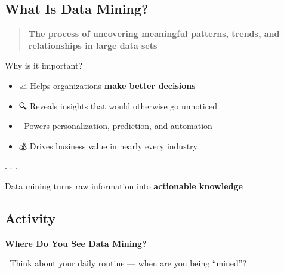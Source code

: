 \documentclass[
  letterpaper,
  DIV=11,
  numbers=noendperiod]{scrartcl}
\providecommand{\tightlist}{%
  \setlength{\itemsep}{0pt}\setlength{\parskip}{0pt}}
\begin{document}
\subsection{What Is Data Mining?}\label{what-is-data-mining-1}

\begin{quote}
\textbf{The process of uncovering meaningful patterns, trends, and
relationships in large data sets}
\end{quote}

Why is it important?

\begin{itemize}
\tightlist
\item
  📈 Helps organizations \textbf{make better decisions}
\item
  🔍 Reveals insights that would otherwise go unnoticed
\item
  🤖 Powers personalization, prediction, and automation
\item
  💰 Drives business value in nearly every industry
\end{itemize}

. . .

\begin{tcolorbox}[enhanced jigsaw, colbacktitle=quarto-callout-important-color!10!white, opacityback=0, colback=white, opacitybacktitle=0.6, toptitle=1mm, left=2mm, bottomrule=.15mm, breakable, bottomtitle=1mm, rightrule=.15mm, titlerule=0mm, title=\textcolor{quarto-callout-important-color}{\faExclamation}\hspace{0.5em}{Important}, coltitle=black, colframe=quarto-callout-important-color-frame, arc=.35mm, toprule=.15mm, leftrule=.75mm]

{Data mining turns raw information into \textbf{actionable knowledge}}

\end{tcolorbox}

\subsection{Activity}\label{activity}

\begin{tcolorbox}[enhanced jigsaw, leftrule=.75mm, opacityback=0, colback=white, breakable, toprule=.15mm, rightrule=.15mm, left=2mm, colframe=quarto-callout-color-frame, arc=.35mm, bottomrule=.15mm]

\vspace{-3mm}\textbf{Where Do You See Data Mining?}\vspace{3mm}

🤔 Think about your daily routine --- when are you being ``mined''?

\end{tcolorbox}
\end{document}
